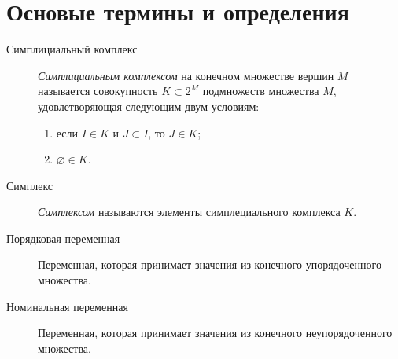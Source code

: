 \section{Основые термины и определения}

\begin{description}
    \item[Симплициальный комплекс] {\it Симплициальным комплексом} на конечном множестве вершин $M$ называется совокупность $K \subset 2^{M}$ подмножеств множества $M$, удовлетворяющая следующим двум условиям:
    \begin{enumerate}
        \item если $I \in K$ и $J \subset I$, то $J \in K$;
        \item $\varnothing \in K$.
    \end{enumerate}
    \item[Симплекс] {\it Симплексом} называются элементы симплециального комплекса $K$.
    \item[Порядковая переменная] Переменная, которая принимает значения из конечного упорядоченного множества.
    \item[Номинальная переменная] Переменная, которая принимает значения из конечного неупорядоченного множества.
\end{description}